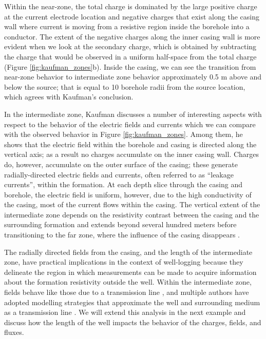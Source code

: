 Within the near-zone, the total charge is dominated by the large positive charge at the current electrode location and negative charges that exist along the casing wall where current is moving from a resistive region inside the borehole into a conductor. The extent of the negative charges along the inner casing wall is more evident when we look at the secondary charge, which is obtained by subtracting the charge that would be observed in a uniform half-space from the total charge (Figure \ref{fig:kaufman_zones}b). Inside the casing, we can see the transition from near-zone behavior to intermediate zone behavior approximately 0.5 m above and below the source; that is equal to 10 borehole radii from the source location, which agrees with Kaufman's conclusion.

In the intermediate zone, Kaufman discusses a number of interesting aspects with respect to  the behavior of the electric fields and currents which we can compare with the observed behavior in Figure \ref{fig:kaufman_zones}. Among them, he shows that the electric field within the borehole and casing is directed along the vertical axis; as a result no charges accumulate on the inner casing wall. Charges do, however, accumulate on the outer surface of the casing; these  generate radially-directed electric fields and currents, often referred to as “leakage currents”, within the formation. At each depth slice through the casing and borehole, the electric field is uniform, however, due to the high conductivity of the casing, most of the current flows within the casing.  The vertical extent of the intermediate zone depends on the resistivity contrast between the casing and the surrounding formation and extends beyond several hundred meters before transitioning to the far zone, where the influence of the casing disappears \citep{Kaufman1990}.




The radially directed fields from the casing, and the length of the intermediate zone, have practical implications in the context of well-logging because they delineate the region in which measurements can be made to acquire information about the formation resistivity outside the well. Within the intermediate zone, fields behave like those due to a transmission line \citep{Kaufman1990}, and multiple authors have adopted modelling strategies that approximate the well and surrounding medium as a transmission line \citep{Kong2009, Aldridge2015}. We will extend this analysis in the next example and discuss how the length of the well impacts the behavior of the charges, fields, and fluxes.
